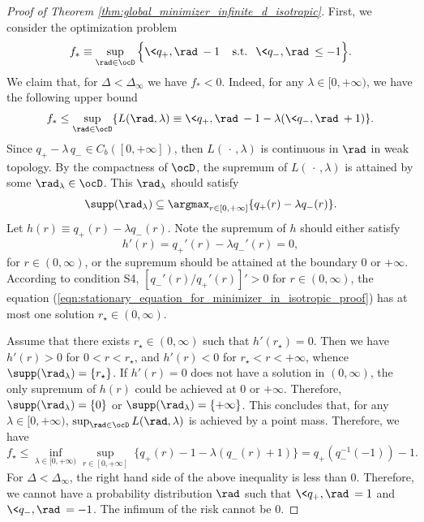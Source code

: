 \documentclass[11pt]{article}
\begin{document}
\begin{proof}[Proof of Theorem \ref{thm:global_minimizer_infinite_d_isotropic}]
First, we consider the optimization problem
\begin{equation}\label{eqn:f_star_in_isotropic_proof}
f_* \equiv 
\sup_{\rad \in \ocD} \Big\{\< q_+, \rad\>  - 1\; \;\;\; \mbox{s.t.} \;\;\, \< q_-, \rad \> \le -1\Big\}.
\end{equation}
%
We claim that, for $\Delta < \Delta_\infty$ we have $f_* < 0$. 
Indeed, for any  $\lambda \in [0, +\infty)$, we have the following upper bound
%
\begin{align}
f_* \le \sup_{\rad \in \ocD} \{ L(\rad, \lambda) \equiv  \< q_+, \rad\> - 1 - \lambda (\< q_-, \rad\> + 1 )\}. 
\end{align}
Since $q_+ - \lambda\, q_- \in C_b([0, +\infty])$, then $L(\, \cdot \,, \lambda)$ is continuous in $\rad$ in weak topology. By the compactness of $\ocD$, the supremum of $L(\, \cdot \,, \lambda)$ is attained by some $\rad_\lambda \in \ocD$. This $\rad_\lambda$ should satisfy
\[
\supp(\rad_\lambda) \subseteq\argmax_{r \in [0, +\infty]} \{ q_+(r) - \lambda q_-(r)\}. 
\]
Let $h(r) \equiv q_+(r) - \lambda q_-(r)$. Note the supremum of $h$ should either satisfy 
\begin{equation}\label{eqn:stationary_equation_for_minimizer_in_isotropic_proof}
h'(r) = q_+'(r) - \lambda q_-'(r) = 0,
\end{equation}
for $r \in (0, \infty)$, or the supremum should be attained at the boundary $0$ or $+\infty$. According to condition {\sf S4}, $[q_-'(r) / q_+'(r)]' > 0$ for $r \in (0, \infty)$, the equation (\ref{eqn:stationary_equation_for_minimizer_in_isotropic_proof}) has at most one solution $r_\star \in (0, \infty)$. 

Assume that  there exists $r_\star \in (0, \infty)$ such that $h'(r_\star) = 0$. Then we have $h'(r)>0$ for  $0 < r < r_\star$, and $h'(r)<0$ for  $r_\star < r < +\infty$, whence 
$\supp(\rad_\lambda) = \{r_\star\}$. If $h'(r) = 0$ does not have a solution in $(0, \infty)$, the only supremum of $h(r)$ could be achieved at $0$ or $+\infty$. Therefore, $\supp(\rad_\lambda) = \{ 0\}$ or $\supp(\rad_\lambda) = \{ +\infty \}$. This concludes that, for any $\lambda \in [0, +\infty)$, $\sup_{\rad \in \ocD} L(\rad, \lambda)$ is achieved by a point mass. Therefore, we have
\[
f_\star \le \inf_{\lambda \in [0, +\infty)}\sup_{r \in [0, +\infty]} ~ \{ q_+(r) - 1 - \lambda (q_-(r) + 1 ) \} = q_+(q_-^{-1}(-1)) - 1. 
\]
For $\Delta < \Delta_\infty$, the right hand side of the above inequality is less than $0$.  Therefore, we cannot have a probability distribution $\rad$ such that $\< q_+, \rad \> = 1$ and $\< q_-, \rad \> = -1$. The infimum of the risk cannot be $0$. 


\end{proof}
\end{document}

